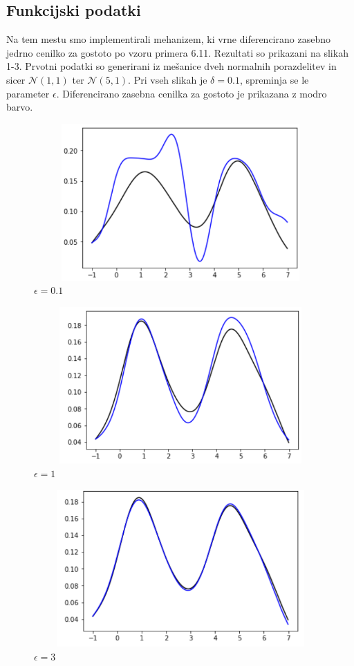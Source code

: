 \documentclass[12pt,a4paper]{amsart}
\theoremstyle{definition} %
\theoremstyle{plain} %
\begin{document}
\subsection{Funkcijski podatki}

Na tem mestu smo implementirali mehanizem, ki vrne diferencirano zasebno jedrno cenilko za gostoto po vzoru primera 6.11. Rezultati so prikazani na slikah 1-3. Prvotni podatki so generirani iz mešanice dveh normalnih porazdelitev in sicer $\mathcal{N}(1,1)$ ter $\mathcal{N}(5,1)$. Pri vseh slikah je $\delta = 0.1$, spreminja se le parameter $\epsilon$. Diferencirano zasebna cenilka za gostoto je prikazana z modro barvo.

\begin{figure}[!htb]
\centering
\caption{$\epsilon = 0.1$}
\includegraphics[width = 12cm, height = 6cm]{prva}
\end{figure}

\begin{figure}[!htb]
\centering
\caption{$\epsilon = 1$}
\includegraphics[width = 12cm, height = 6cm]{druga}
\end{figure}

\begin{figure}[!htb]
\centering
\caption{$\epsilon = 3$}
\includegraphics[width = 12cm, height = 6cm]{tretja}
\end{figure}
\end{document}
